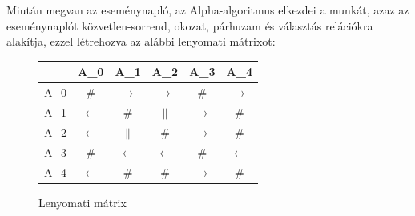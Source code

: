 Miután megvan az eseménynapló, az Alpha-algoritmus elkezdei a munkát, azaz az eseménynaplót közvetlen-sorrend, okozat, párhuzam és választás relációkra alakítja, ezzel létrehozva az alábbi lenyomati mátrixot:

\begin{figure}[h]
\begin{center}
\caption{Lenyomati mátrix}
\begin{tabular}{|c | c | c | c | c | c|}
	\hline
	\hspace{0.1cm} & A\_0 & A\_1 & A\_2 & A\_3 & A\_4 \\
	\hline
	A\_0 & \# & $\rightarrow$ & $\rightarrow$ & \# & $\rightarrow$ \\
	\hline
	A\_1 & $\leftarrow$ & \# & $\parallel$ & $\rightarrow$ & \# \\
	\hline
	A\_2 & $\leftarrow$ & $\parallel$ & \# & $\rightarrow$ & \# \\
	\hline
	A\_3  & \# & $\leftarrow$ & $\leftarrow$ & \# & $\leftarrow$ \\
	\hline
	A\_4 & $\leftarrow$ & \# & \# & $\rightarrow$ & \# \\
	\hline
\end{tabular}
\label{fig:planexample}
\end{center}
\end{figure}




























